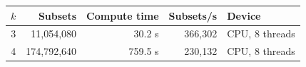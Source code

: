\begin{tabular}{rrrrl}
\toprule
$k$ & Subsets & Compute time & Subsets/s & Device \\
\midrule
3 & 11,054,080 & 30.2 s & 366,302 & CPU, 8 threads \\
4 & 174,792,640 & 759.5 s & 230,132 & CPU, 8 threads \\
\bottomrule
\end{tabular}

